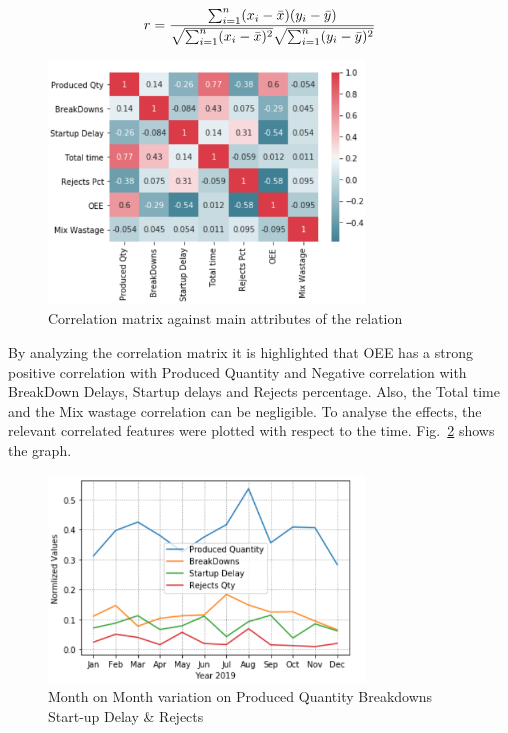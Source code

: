 \begin{equation}\label{Pearson_Correlation}
r =
  \frac{ \sum_{i=1}^{n}(x_i-\bar{x})(y_i-\bar{y}) }{%
        \sqrt{\sum_{i=1}^{n}(x_i-\bar{x})^2}\sqrt{\sum_{i=1}^{n}(y_i-\bar{y})^2}}
\end{equation}

\begin{figure}[ht]
  \begin{center}
  \includegraphics[width=3.3in]{photo/corr_all.png}
  \caption{Correlation matrix against main attributes of the relation}\label{correlation}
  \end{center}
\end{figure}


By analyzing the correlation matrix it is highlighted that OEE has a strong positive correlation with Produced Quantity and Negative correlation with BreakDown Delays, Startup delays and Rejects percentage. Also, the Total time and the Mix wastage correlation can be negligible. To analyse the effects, the relevant correlated features were plotted with respect to the time. Fig.~\ref{comparison} shows the graph. 

\begin{figure}[ht]
  \begin{center}
  \includegraphics[width=3.3in]{photo/july_comp.png}
  \caption{Month on Month variation on Produced Quantity Breakdowns Start-up Delay \& Rejects}\label{comparison}
  \end{center}
\end{figure}

